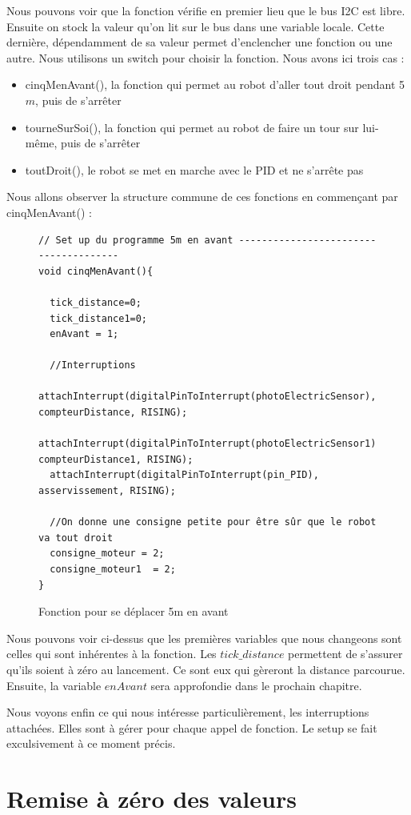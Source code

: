 \documentclass[
	a4paper,									%
	11pt,										%
	twoside,									%
	openright,									%
	notitlepage,									%
	parskip=half,								%
]{scrreprt}										%
\begin{document}
Nous pouvons voir que la fonction vérifie en premier lieu que le bus I2C est libre. Ensuite on stock la valeur 
qu'on lit sur le bus dans une variable locale. Cette dernière, dépendamment de sa valeur permet d'enclencher 
une fonction ou une autre. Nous utilisons un switch pour choisir la fonction. Nous avons ici trois cas :

\begin{itemize}
	\item cinqMenAvant(), la fonction qui permet au robot d'aller tout droit pendant 5$m$, puis de s'arrêter
 	\item tourneSurSoi(), la fonction qui permet au robot de faire un tour sur lui-même, puis de s'arrêter
  	\item toutDroit(), le robot se met en marche avec le PID et ne s'arrête pas
\end{itemize}
\newpage
Nous allons observer la structure commune de ces fonctions en commençant par cinqMenAvant() : 

\begin{figure}[!ht]
	
	\begin{verbatim}
// Set up du programme 5m en avant --------------------------------------
void cinqMenAvant(){
  
  tick_distance=0;
  tick_distance1=0;
  enAvant = 1;

  //Interruptions 
  attachInterrupt(digitalPinToInterrupt(photoElectricSensor), compteurDistance, RISING);
  attachInterrupt(digitalPinToInterrupt(photoElectricSensor1), compteurDistance1, RISING);
  attachInterrupt(digitalPinToInterrupt(pin_PID), asservissement, RISING);

  //On donne une consigne petite pour être sûr que le robot va tout droit
  consigne_moteur = 2;
  consigne_moteur1  = 2;
}
	\end{verbatim}
	\caption{Fonction pour se déplacer 5m en avant}
	\label{cinqMenAvant}
	\end{figure}
Nous pouvons voir ci-dessus que les premières variables que nous changeons sont celles qui sont inhérentes
à la fonction. Les $tick\_distance$ permettent de s'assurer qu'ils soient à zéro au lancement. Ce sont eux qui gèreront
la distance parcourue. Ensuite, la variable $enAvant$ sera approfondie dans le prochain chapitre. \par

Nous voyons enfin ce qui nous intéresse particulièrement, les interruptions attachées. Elles sont à gérer pour
chaque appel de fonction. Le setup se fait exculsivement à ce moment précis.


\newpage
\section{Remise à zéro des valeurs}
\end{document}
